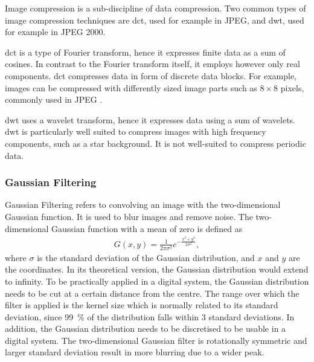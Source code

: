 Image compression is a sub-discipline of data compression. Two common types of image compression techniques are \gls{dct}, used for example in JPEG, and \gls{dwt}, used for example in JPEG 2000.

\Gls{dct} is a type of Fourier transform, hence it expresses finite data as a sum of cosines. In contrast to the Fourier transform itself, it employs however only real components. \Gls{dct} compresses data in form of discrete data blocks. For example, images can be compressed with differently sized image parts such as $8\times8$ pixels, commonly used in JPEG \cite{Bocharova2009CompressionMultimedia}.

\Gls{dwt} uses a wavelet transform, hence it expresses data using a sum of wavelets. \Gls{dwt} is particularly well suited to compress images with high frequency components, such as a star background. It is not well-suited to compress periodic data.


\subsubsection{Gaussian Filtering} \label{sec:t_gauss}
Gaussian Filtering refers to convolving an image with the two-dimensional Gaussian function. It is used to blur images and remove noise. The two-dimensional Gaussian function with a mean of zero is defined as
\begin{align}
    G(x,y) = \frac{1}{2\pi \sigma^{2}}e^{-\frac{x^2+y^2}{2\sigma^2}}, \label{eq:gauss_2d}
\end{align}
where $\sigma$ is the standard deviation of the Gaussian distribution, and $x$ and $y$ are the coordinates.
In its theoretical version, the Gaussian distribution would extend to infinity. To be practically applied in a digital system, the Gaussian distribution needs to be cut at a certain distance from the centre. The range over which the filter is applied is the kernel size which is normally related to its standard deviation, since \SI{99}{\percent} of the distribution falls within 3 standard deviations. In addition, the Gaussian distribution needs to be discretised to be usable in a digital system. The two-dimensional Gaussian filter is rotationally symmetric and larger standard deviation result in more blurring due to a wider peak.

